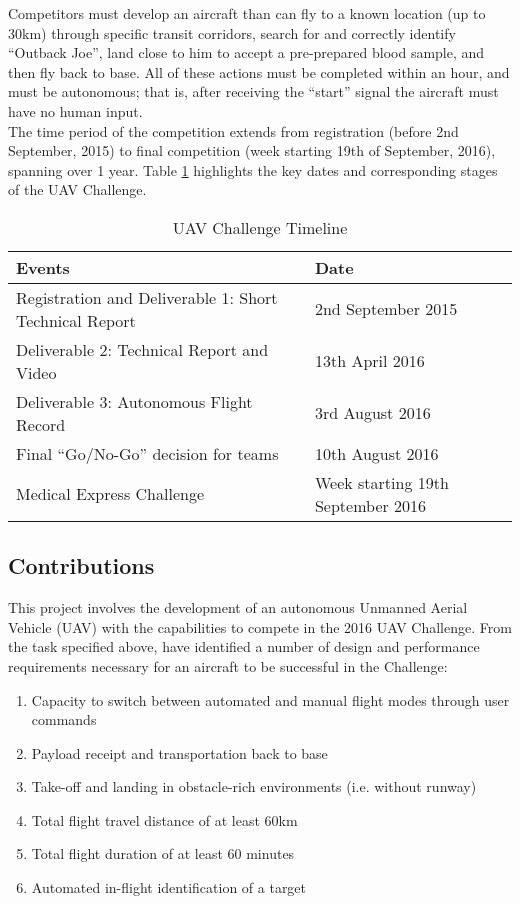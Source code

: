 Competitors must develop an aircraft than can fly to a known location (up to 30km) through specific transit corridors, search for and correctly identify ``Outback Joe'', land close to him to accept a pre-prepared blood sample, and then fly back to base. All of these actions must be completed within an hour, and must be autonomous; that is, after receiving the ``start'' signal the aircraft must have no human input.\\

The time period of the competition extends from registration (before 2nd September, 2015) to final competition (week starting 19th of September, 2016), spanning over 1 year. Table \ref{tab:challenge} highlights the key dates and corresponding stages of the UAV Challenge.\\

\begin{table}[!ht]
	\caption{UAV Challenge Timeline}
	\label{tab:challenge}
	\centering
	\begin{tabular}{ | l | l | }
		\hline
		\textbf{Events} & \textbf{Date} \\ \hline \hline
		Registration and Deliverable 1: Short Technical Report & 2nd September 2015 \\ \hline
		Deliverable 2: Technical Report and Video & 13th April 2016 \\ \hline
		Deliverable 3: Autonomous Flight Record & 3rd August 2016 \\ \hline
		Final ``Go/No-Go'' decision for teams & 10th August 2016 \\ \hline
		Medical Express Challenge & Week starting 19th September 2016 \\
		\hline
	\end{tabular}
\end{table}

\subsection{\ID Contributions}
This project involves the development of an autonomous Unmanned Aerial Vehicle (UAV) with the capabilities to compete in the 2016 UAV Challenge. From the task specified above, \ID have identified a number of design and performance requirements necessary for an aircraft to be successful in the Challenge:
\begin{enumerate}[label=\bfseries R\arabic*:] \itemsep-2pt
	\item Capacity to switch between automated and manual flight modes through user commands
	\item Payload receipt and transportation back to base
	\item Take-off and landing in obstacle-rich environments (i.e. without runway)
	\item Total flight travel distance of at least 60km
	\item Total flight duration of at least 60 minutes
	\item Automated in-flight identification of a target
\end{enumerate}

